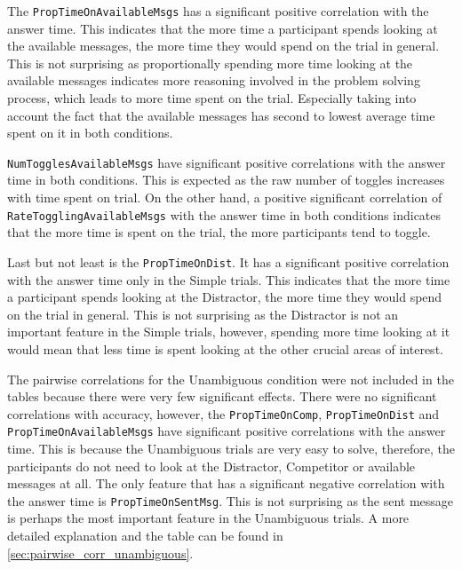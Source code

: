 The \texttt{PropTimeOnAvailableMsgs} has a significant positive correlation with the answer time. This indicates that the more time a participant spends looking at the available messages, the more time they would spend on the trial in general. This is not surprising as proportionally spending more time looking at the available messages indicates more reasoning involved in the problem solving process, which leads to more time spent on the trial. Especially taking into account the fact that the available messages has second to lowest average time spent on it in both conditions. 

\texttt{NumTogglesAvailableMsgs} have significant positive correlations with the answer time in both conditions. This is expected as the raw number of toggles increases with time spent on trial. On the other hand, a positive significant correlation of \texttt{RateTogglingAvailableMsgs} with the answer time in both conditions indicates that the more time is spent on the trial, the more participants tend to toggle. 

Last but not least is the \texttt{PropTimeOnDist}. It has a significant positive correlation with the answer time only in the Simple trials. This indicates that the more time a participant spends looking at the Distractor, the more time they would spend on the trial in general. This is not surprising as the Distractor is not an important feature in the Simple trials, however, spending more time looking at it would mean that less time is spent looking at the other crucial areas of interest.

\sloppy
The pairwise correlations for the Unambiguous condition were not included in the tables because there were very few significant effects. There were no significant correlations with accuracy, however, the \texttt{PropTimeOnComp}, \texttt{PropTimeOnDist} and \texttt{PropTimeOnAvailableMsgs} have significant positive correlations with the answer time. This is because the Unambiguous trials are very easy to solve, therefore, the participants do not need to look at the Distractor, Competitor or available messages at all. The only feature that has a significant negative correlation with the answer time is \texttt{PropTimeOnSentMsg}. This is not surprising as the sent message is perhaps the most important feature in the Unambiguous trials. A more detailed explanation and the table can be found in \autoref{sec:pairwise_corr_unambiguous}.
\sloppy

